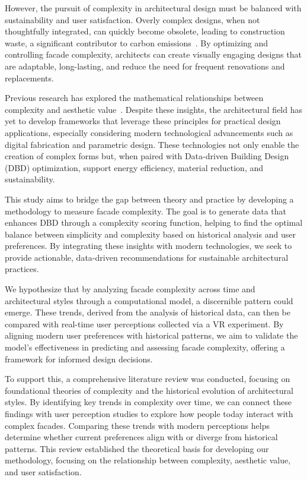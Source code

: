 
However, the pursuit of complexity in architectural design must be balanced with sustainability and user satisfaction.
Overly complex designs, when not thoughtfully integrated, can quickly become obsolete, leading to construction waste, a significant contributor to carbon emissions~\cite{Oberfrancova2021}.
By optimizing and controlling facade complexity, architects can create visually engaging designs that are adaptable, long-lasting, and reduce the need for frequent renovations and replacements.

Previous research has explored the mathematical relationships between complexity and aesthetic value~\cite{Bies2016, Douchova2016, Redies2015}.
Despite these insights, the architectural field has yet to develop frameworks that leverage these principles for practical design applications, especially considering modern technological advancements such as digital fabrication and parametric design.
These technologies not only enable the creation of complex forms but, when paired with Data-driven Building Design (DBD) optimization, support energy efficiency, material reduction, and sustainability.

This study aims to bridge the gap between theory and practice by developing a methodology to measure facade complexity.
The goal is to generate data that enhances DBD through a complexity scoring function, helping to find the optimal balance between simplicity and complexity based on historical analysis and user preferences.
By integrating these insights with modern technologies, we seek to provide actionable, data-driven recommendations for sustainable architectural practices.

We hypothesize that by analyzing facade complexity across time and architectural styles through a computational model, a discernible pattern could emerge.
These trends, derived from the analysis of historical data, can then be compared with real-time user perceptions collected via a VR experiment.
By aligning modern user preferences with historical patterns, we aim to validate the model's effectiveness in predicting and assessing facade complexity, offering a framework for informed design decisions.

To support this, a comprehensive literature review was conducted, focusing on foundational theories of complexity and the historical evolution of architectural styles.
By identifying key trends in complexity over time, we can connect these findings with user perception studies to explore how people today interact with complex facades.
Comparing these trends with modern perceptions helps determine whether current preferences align with or diverge from historical patterns.
This review established the theoretical basis for developing our methodology, focusing on the relationship between complexity, aesthetic value, and user satisfaction.

